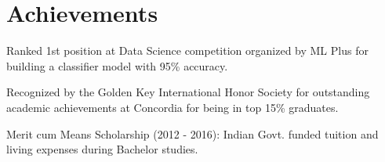 \section{Achievements}
\begin{tightitemize}
\sectionspace %
\item Ranked 1st position at Data Science competition organized by ML Plus for building a classifier model with 95\% accuracy.
\item Recognized by the Golden Key International Honor Society for outstanding academic achievements at Concordia for being in top 15\% graduates.
\item Merit cum Means Scholarship (2012 - 2016): Indian Govt. funded tuition and living expenses during Bachelor studies.
\end{tightitemize}
